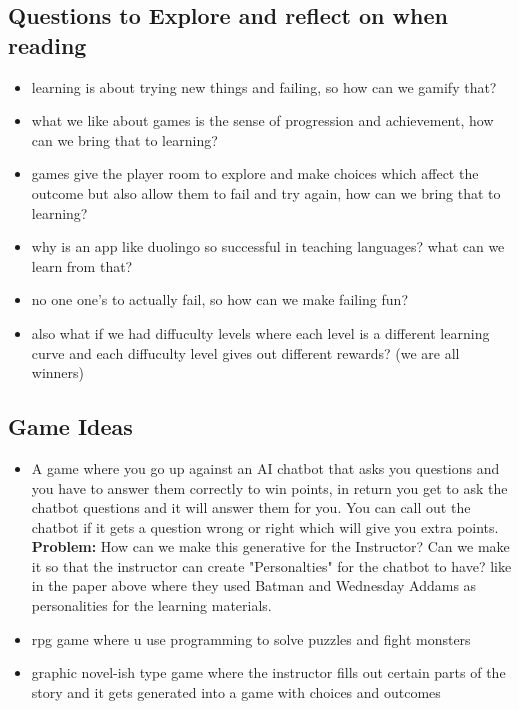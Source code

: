 \documentclass{article}
\begin{document}
\subsection{Questions to Explore and reflect on when reading}
\begin{itemize}
    \item learning is about trying new things and failing, so how can we gamify that?
    \item what we like about games is the sense of progression and achievement, how can we bring that to learning?
    \item games give the player room to explore and make choices which affect the outcome but also allow them to fail and try again, how can we bring that to learning?
    \item why is an app like duolingo so successful in teaching languages? what can we learn from that?
    \item no one one's to actually fail, so how can we make failing fun?
    \item also what if we had diffuculty levels where each level is a different learning curve and each diffuculty level gives out different rewards? (we are all winners)
\end{itemize}

\subsection{Game Ideas}
\begin{itemize}
    \item A game where you go up against an AI chatbot that asks you questions and you have to answer them correctly to win points, 
    in return you get to ask the chatbot questions and it will answer them for you. You can call out the chatbot if it gets a question wrong or right which will give you extra points. 
    \textbf{Problem:} How can we make this generative for the Instructor? Can we make it so that the instructor can create "Personalties" for the chatbot to have? 
    like in the paper above where they used Batman and Wednesday Addams as personalities for the learning materials.
    \item rpg game where u use programming to solve puzzles and fight monsters
    \item graphic novel-ish type game where the instructor fills out certain parts of the story and it gets generated into a game with choices and outcomes
\end{itemize}
\end{document}
